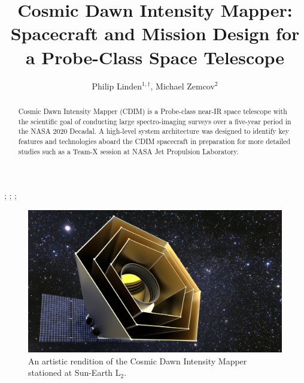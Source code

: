 \documentclass{ws-jai}
\begin{document}
\catchline{}{}{}{}{} %


\title{Cosmic Dawn Intensity Mapper: \\Spacecraft and Mission Design for a Probe-Class Space Telescope}

\author{Philip Linden$^{1,\dagger}$, Michael Zemcov$^{2}$}

\address{
$^1$Department of Mechanical Engineering, Kate Gleason College of Engineering, Rochester
Institute of Technology, Rochester, NY 14623, USA, pjl7651@rit.edu\\
$^2$Center for Detectors, School of Physics and Astronomy, Rochester
Institute of Technology, Rochester, NY 14623, USA, zemcov@cfd.rit.edu\\
}

\maketitle


\begin{history}
;
;
;
\end{history}

\begin{abstract}
  Cosmic Dawn Intensity Mapper (CDIM) is a Probe-class near-IR space telescope with the scientific goal of conducting large spectro-imaging surveys over a five-year period in the NASA 2020 Decadal.
  A high-level system architecture was designed to identify key features and technologies aboard the CDIM spacecraft in preparation for more detailed studies such as a Team-X session at NASA Jet Propulsion Laboratory.
\end{abstract}


\begin{figure}
  \includegraphics[width=\linewidth]{figs/cdim_cover-render.jpg}
  \caption{An artistic rendition of the Cosmic Dawn Intensity Mapper stationed at Sun-Earth L$_2$.}
\label{fig:cover}
\end{figure}
\end{document}
